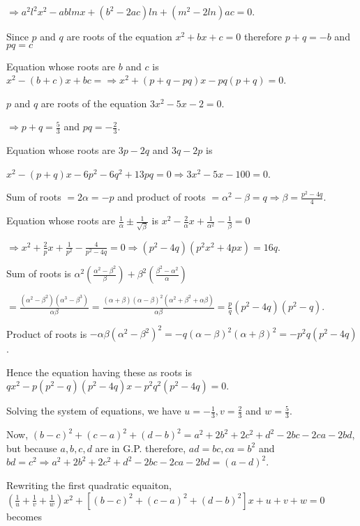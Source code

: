   $\Rightarrow a^2l^2x^2 - ablmx + (b^2 - 2ac)ln + (m^2 - 2ln)ac = 0$.
\item Since $p$ and $q$ are roots of the equation $x^2 + bx + c = 0$ therefore $p + q = -b$ and
  $pq = c$

  Equation whose roots are $b$ and $c$ is $x^2 - (b + c)x + bc = \Rightarrow x^2 +(p + q - pq)x - pq(p + q)
  = 0$.
\item $p$ and $q$ are roots of the equation $3x^2 - 5x - 2 = 0$.

  $\Rightarrow p + q = \frac{5}{3}$ and $pq = -\frac{2}{3}$.

  Equation whose roots are $3p - 2q$ and $3q - 2p$ is

  $x^2 - (p + q)x - 6p^2 - 6q^2 + 13pq = 0\Rightarrow 3x^2 - 5x - 100 = 0$.
\item Sum of roots $= 2\alpha = -p$ and product of roots $= \alpha^2 - \beta = q \Rightarrow \beta =
  \frac{p^2 - 4q}{4}$.

  Equation whose roots are $\frac{1}{\alpha}\pm \frac{1}{\sqrt{\beta}}$ is $x^2 - \frac{2}{\alpha}x +
  \frac{1}{\alpha^2} - \frac{1}{\beta} = 0$

  $\Rightarrow x^2 + \frac{2}{p}x + \frac{1}{p^2} - \frac{4}{p^2 - 4q} = 0\Rightarrow (p^2 - 4q)(p^2x^2 +
  4px) = 16q$.
\item Sum of roots is $\alpha^2\left(\frac{\alpha^2 - \beta^2}{\beta}\right) + \beta^2\left(\frac{\beta^2 -
  \alpha^2}{\alpha}\right)$

  $= \frac{(\alpha^2 - \beta^2)(\alpha^3 - \beta^3)}{\alpha\beta} = \frac{(\alpha + \beta)(\alpha -
  \beta)^2(\alpha^2 + \beta^2 + \alpha\beta)}{\alpha\beta}= \frac{p}{q}(p^2 - 4q)(p^2 - q)$.

  Product of roots is $-\alpha\beta(\alpha^2 - \beta^2)^2 = -q(\alpha - \beta)^2(\alpha + \beta)^2 =
  -p^2q(p^2 - 4q)$.

  Hence the equation having these as roots is $qx^2 - p(p^2 - q)(p^2 - 4q)x - p^2q^2(p^2 - 4q) = 0$.
\item Solving the system of equations, we have $u = -\frac{1}{3}, v = \frac{2}{3}$ and $w = \frac{5}{3}$.

  Now, $(b - c)^2 + (c - a)^2 + (d - b)^2 = a^2 + 2b^2 + 2c^2 + d^2 - 2bc - 2ca - 2bd$, but because $a, b,
  c, d$ are in G.P. therefore, $ad = bc, ca = b^2$ and $bd = c^2\Rightarrow a^2 + 2b^2 + 2c^2 + d^2 - 2bc -
  2ca - 2bd = (a - d)^2$.

  Rewriting the first quadratic equaiton, $\left(\frac{1}{u} + \frac{1}{v} + \frac{1}{w}\right)x^2 +[(b - c)^2 + (c -
    a)^2 + (d - b)^2]x + u + v + w = 0$ becomes


